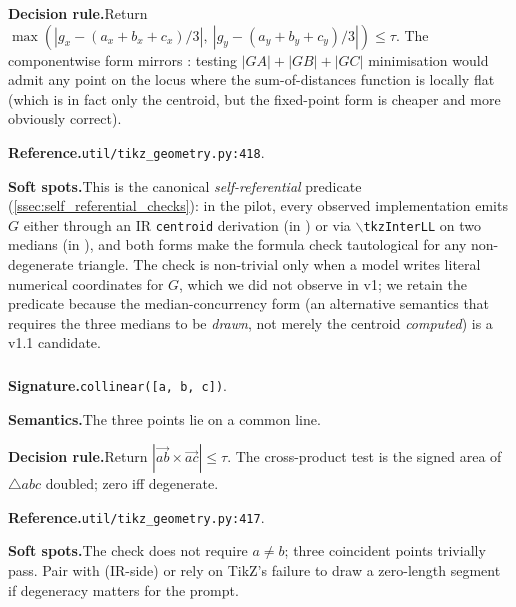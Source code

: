 \noindent\textbf{Decision rule.}\quad Return $\max(|g_x - (a_x{+}b_x{+}c_x)/3|,\ |g_y - (a_y{+}b_y{+}c_y)/3|) \leq \tau$.
The componentwise form mirrors : testing $|GA|+|GB|+|GC|$ minimisation would admit any point on the locus where the sum-of-distances function is locally flat (which is in fact only the centroid, but the fixed-point form is cheaper and more obviously correct).

\noindent\textbf{Reference.}\quad \texttt{util/tikz\_geometry.py:418}.

\noindent\textbf{Soft spots.}\quad This is the canonical \emph{self-referential} predicate (\cref{ssec:self_referential_checks}): in the pilot, every observed implementation emits $G$ either through an IR \texttt{centroid} derivation (in \structured) or via $\backslash$\texttt{tkzInterLL} on two medians (in \rawcode), and both forms make the formula check tautological for any non-degenerate triangle.
The check is non-trivial only when a model writes literal numerical coordinates for $G$, which we did not observe in v1; we retain the predicate because the median-concurrency form (an alternative semantics that requires the three medians to be \emph{drawn}, not merely the centroid \emph{computed}) is a v1.1 candidate.

\subsubsection{}
\label{app:pred:collinear}

\noindent\textbf{Signature.}\quad \texttt{collinear([a, b, c])}.

\noindent\textbf{Semantics.}\quad The three points lie on a common line.

\noindent\textbf{Decision rule.}\quad Return $|\vec{ab}\times\vec{ac}| \leq \tau$.
The cross-product test is the signed area of $\triangle abc$ doubled; zero iff degenerate.

\noindent\textbf{Reference.}\quad \texttt{util/tikz\_geometry.py:417}.

\noindent\textbf{Soft spots.}\quad The check does not require $a \neq b$; three coincident points trivially pass.
Pair with  (IR-side) or rely on TikZ's failure to draw a zero-length segment if degeneracy matters for the prompt.

\subsubsection{}
\label{app:pred:equal_lengths}

